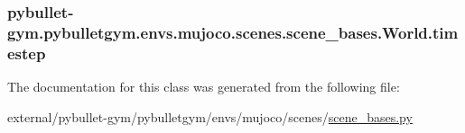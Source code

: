 \subsubsection[{\texorpdfstring{timestep}{timestep}}]{\setlength{\rightskip}{0pt plus 5cm}pybullet-\/gym.\+pybulletgym.\+envs.\+mujoco.\+scenes.\+scene\+\_\+bases.\+World.\+timestep}\hypertarget{classpybullet-gym_1_1pybulletgym_1_1envs_1_1mujoco_1_1scenes_1_1scene__bases_1_1_world_a0fb9463209c135067d062c1fecff8be7}{}\label{classpybullet-gym_1_1pybulletgym_1_1envs_1_1mujoco_1_1scenes_1_1scene__bases_1_1_world_a0fb9463209c135067d062c1fecff8be7}


The documentation for this class was generated from the following file\+:\begin{DoxyCompactItemize}
\item 
external/pybullet-\/gym/pybulletgym/envs/mujoco/scenes/\hyperlink{mujoco_2scenes_2scene__bases_8py}{scene\+\_\+bases.\+py}\end{DoxyCompactItemize}
